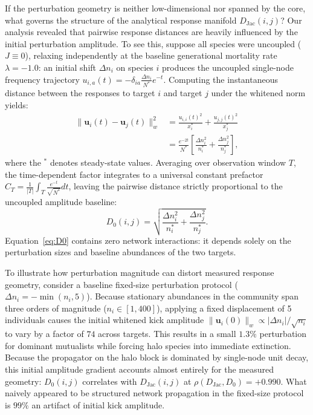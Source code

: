 \documentclass[twocolumn,amsmath,amssymb,aps,pra,10pt,floatfix,nofootinbib]{revtex4-2}
\begin{document}
If the perturbation geometry is neither low-dimensional nor spanned by the core, what governs the structure of the analytical response manifold $D_{\text{Jac}}(i,j)$? Our analysis revealed that pairwise response distances are heavily influenced by the initial perturbation amplitude. To see this, suppose all species were uncoupled ($J \equiv 0$), relaxing independently at the baseline generational mortality rate $\lambda = -1.0$: an initial shift $\Delta n_i$ on species $i$ produces the uncoupled single-node frequency trajectory $u_{i, a}(t) = -\delta_{ia} \frac{\Delta n_i}{N^*} e^{-t}$. Computing the instantaneous distance between the responses to target $i$ and target $j$ under the whitened norm yields:
\begin{equation}
\begin{split}
\|\mathbf{u}_i(t) - \mathbf{u}_j(t)\|_w^2 &= \frac{u_{i,i}(t)^2}{x_i^*} + \frac{u_{j,j}(t)^2}{x_j^*} \\
&= \frac{e^{-2t}}{N^*} \left[ \frac{\Delta n_i^2}{n_i^*} + \frac{\Delta n_j^2}{n_j^*} \right],
\end{split}
\end{equation}
where the $^*$ denotes steady-state values. Averaging over observation window $T$, the time-dependent factor integrates to a universal constant prefactor $C_T = \frac{1}{|T|} \int_T \frac{e^{-t}}{\sqrt{N^*}} dt$, leaving the pairwise distance strictly proportional to the uncoupled amplitude baseline:
\begin{equation}
D_0(i,j) = \sqrt{\frac{\Delta n_i^2}{n_i^*} + \frac{\Delta n_j^2}{n_j^*}}.
\label{eq:D0}
\end{equation}
Equation~\eqref{eq:D0} contains zero network interactions: it depends solely on the perturbation sizes and baseline abundances of the two targets.

To illustrate how perturbation magnitude can distort measured response geometry, consider a baseline fixed-size perturbation protocol ($\Delta n_i = -\min(n_i, 5)$). Because stationary abundances in the community span three orders of magnitude ($n_i \in [1, 400]$), applying a fixed displacement of 5 individuals causes the initial whitened kick amplitude $\|\mathbf{u}_i(0)\|_w \propto |\Delta n_i| / \sqrt{n_i}$ to vary by a factor of $74$ across targets. This results in a small $1.3\%$ perturbation for dominant mutualists while forcing halo species into immediate extinction. Because the propagator on the halo block is dominated by single-node unit decay, this initial amplitude gradient accounts almost entirely for the measured geometry: $D_0(i,j)$ correlates with $D_{\text{Jac}}(i,j)$ at $\rho(D_{\text{Jac}}, D_0) = +0.990$. What naively appeared to be structured network propagation in the fixed-size protocol is $99\%$ an artifact of initial kick amplitude.
\end{document}
